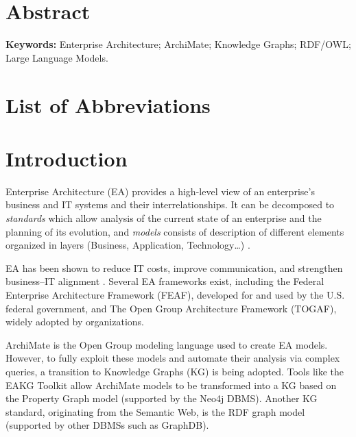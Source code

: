\documentclass[12pt, a4paper]{report}
\begin{document}
\pagestyle{empty}


\pagestyle{fancy}

\chapter*{Abstract}


\noindent\textbf{Keywords:} Enterprise Architecture; ArchiMate; Knowledge Graphs; RDF/OWL; Large Language Models.

\tableofcontents

\listoffigures

\listoftables

\chapter*{List of Abbreviations}


\cleardoublepage
{}

\chapter*{Introduction}
Enterprise Architecture (EA) provides a high-level view of an enterprise's business and IT systems and their interrelationships. It can be decomposed to \emph{standards} which allow analysis of the current state of an enterprise and the planning of its evolution, and \emph{models} consists of description of different elements organized in layers (Business, Application, Technology\ldots) \parencite{Gong2019}.

EA has been shown to reduce IT costs, improve communication, and strengthen business--IT alignment \parencite{Gong2019}. Several EA frameworks exist, including the Federal Enterprise Architecture Framework (FEAF), developed for and used by the U.S. federal government, and The Open Group Architecture Framework (TOGAF), widely adopted by organizations.

ArchiMate is the Open Group modeling language used to create EA models. However, to fully exploit these models and automate their analysis via complex queries, a transition to Knowledge Graphs (KG) is being adopted.
Tools like the EAKG Toolkit \parencite{glaser2022toolkit} allow ArchiMate models to be transformed into a KG based on the Property Graph model (supported by the Neo4j DBMS). Another KG standard, originating from the Semantic Web, is the RDF \parencite{w3c-rdf} graph model (supported by other DBMSs such as GraphDB).
\end{document}
